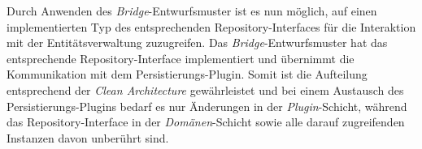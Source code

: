 Durch Anwenden des \textit{Bridge}-Entwurfsmuster ist es nun möglich, auf einen implementierten Typ des entsprechenden Repository-Interfaces für die Interaktion mit der Entitätsverwaltung zuzugreifen.
Das \textit{Bridge}-Entwurfsmuster hat das entsprechende Repository-Interface implementiert und übernimmt die Kommunikation mit dem Persistierungs-Plugin.
Somit ist die Aufteilung entsprechend der \textit{Clean Architecture} gewährleistet und bei einem Austausch des Persistierungs-Plugins bedarf es nur Änderungen in der \textit{Plugin}-Schicht, während das Repository-Interface in der \textit{Domänen}-Schicht sowie alle darauf zugreifenden Instanzen davon unberührt sind.
